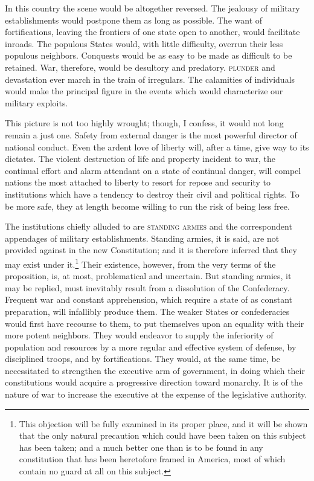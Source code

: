 In this country the scene would be altogether reversed. 
The jealousy of military establishments would postpone them as long as possible. 
The want of fortifications, leaving the frontiers of one state open to another, would facilitate inroads. 
The populous States would, with little difficulty, overrun their less populous neighbors. 
Conquests would be as easy to be made as difficult to be retained. 
War, therefore, would be desultory and predatory. 
\textsc{plunder} and devastation ever march in the train of irregulars. 
The calamities of individuals would make the principal figure in the events which would characterize our military exploits.

This picture is not too highly wrought; though, I confess, it would not long remain a just one. 
Safety from external danger is the most powerful director of national conduct. 
Even the ardent love of liberty will, after a time, give way to its dictates. 
The violent destruction of life and property incident to war, the continual effort and alarm attendant on a state of continual danger, will compel nations the most attached to liberty to resort for repose and security to institutions which have a tendency to destroy their civil and political rights. 
To be more safe, they at length become willing to run the risk of being less free.

The institutions chiefly alluded to are \textsc{standing armies} and the correspondent appendages of military establishments. 
Standing armies, it is said, are not provided against in the new Constitution; and it is therefore inferred that they may exist under it.\footnote{This objection will be fully examined in its proper place, and it will be shown that the only natural precaution which could have been taken on this subject has been taken; and a much better one than is to be found in any constitution that has been heretofore framed in America, most of which contain no guard at all on this subject.} Their existence, however, from the very terms of the proposition, is, at most, problematical and uncertain. 
But standing armies, it may be replied, must inevitably result from a dissolution of the Confederacy. 
Frequent war and constant apprehension, which require a state of as constant preparation, will infallibly produce them. 
The weaker States or confederacies would first have recourse to them, to put themselves upon an equality with their more potent neighbors. 
They would endeavor to supply the inferiority of population and resources by a more regular and effective system of defense, by disciplined troops, and by fortifications. 
They would, at the same time, be necessitated to strengthen the executive arm of government, in doing which their constitutions would acquire a progressive direction toward monarchy. 
It is of the nature of war to increase the executive at the expense of the legislative authority.

